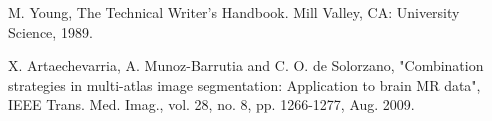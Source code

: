 \begin{thebibliography}{00}
 M. Young, The Technical Writer's Handbook. Mill Valley, CA: University Science, 1989. %

 \color{red} X. Artaechevarria, A. Munoz-Barrutia and C. O. de Solorzano, "Combination strategies in multi-atlas image segmentation: Application to brain MR data", IEEE Trans. Med. Imag., vol. 28, no. 8, pp. 1266-1277, Aug. 2009.
\end{thebibliography}